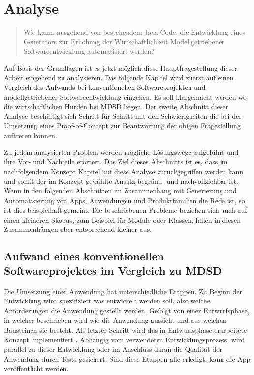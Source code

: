 \documentclass[12pt,oneside,a4paper,parskip]{scrbook}
\begin{document}
\chapter{Analyse}

\begin{quote}\glqq Wie kann, ausgehend von bestehendem Java-Code, die Entwicklung eines Generators zur Erhöhung der Wirtschaftlichkeit Modellgetriebener Softwareentwicklung automatisiert werden?\grqq \end{quote}

Auf Basis der Grundlagen ist es jetzt möglich diese Hauptfragestellung dieser Arbeit eingehend zu analysieren. Das folgende Kapitel wird zuerst auf einen Vergleich des Aufwands bei konventionellen Softwareprojekten und modellgetriebener Softwareentwicklung eingehen. Es soll klargemacht werden wo die wirtschaftlichen Hürden bei MDSD liegen. Der zweite Abschnitt dieser Analyse beschäftigt sich Schritt für Schritt mit den Schwierigkeiten die bei der Umsetzung eines Proof-of-Concept zur Beantwortung der obigen Fragestellung auftreten können.

Zu jedem analysierten Problem werden mögliche Lösungswege aufgeführt und ihre Vor- und Nachteile erörtert. Das Ziel dieses Abschnitts ist es, dass im nachfolgendem Konzept Kapitel auf diese Analyse zurückgegriffen werden kann und somit der im Konzept gewählte Ansatz begründ- und nachvollziehbar ist. Wenn in den folgenden Abschnitten im Zusammenhang mit Generierung und Automatisierung von Apps, Anwendungen und Produktfamilien die Rede ist, so ist dies beispielhaft gemeint. Die beschriebenen Probleme beziehen sich auch auf einen kleineren Skopus, zum Beispiel für Module oder Klassen, fallen in diesen Zusammenhängen aber entsprechend kleiner aus.

\section{Aufwand eines konventionellen Softwareprojektes im Vergleich zu MDSD}

Die Umsetzung einer Anwendung hat unterschiedliche Etappen. Zu Beginn der Entwicklung wird spezifiziert was entwickelt werden soll, also welche Anforderungen die Anwendung gestellt werden. Gefolgt von einer Entwurfsphase, in welcher beschrieben wird wie die Anwendung aussieht und aus welchen Bausteinen sie besteht. Als letzter Schritt wird das in Entwurfsphase erarbeitete Konzept implementiert \cite[S. 62]{balzert2009a}. Abhängig vom verwendeten Entwicklungsprozess, wird parallel zu dieser Entwicklung oder im Anschluss daran die Qualität der Anwendung durch Tests gesichert. Sind diese Etappen alle erledigt, kann die App veröffentlicht werden.
\end{document}
